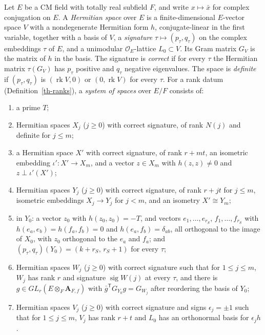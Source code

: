 \begin{definition}\label{th-spaces}
Let $E$ be a CM field with totally real subfield $F$, and write
$x\mapsto\bar x$ for complex conjugation on $E$. A \emph{Hermitian space} over
$E$ is a finite-dimensional $E$-vector space $V$ with a nondegenerate Hermitian
form $h$, conjugate-linear in the first variable, together with a basis of
$V$, a \emph{signature} $\tau\mapsto(p_\tau,q_\tau)$ on the complex embeddings
$\tau$ of $E$, and a unimodular $\mathcal O_E$-lattice $L_0\subset V$. Its
Gram matrix $G_V$ is the matrix of $h$ in the basis. The signature is
\emph{correct} if for every $\tau$ the Hermitian matrix $\tau(G_V)$ has $p_\tau$
positive and $q_\tau$ negative eigenvalues. The space is \emph{definite} if
$(p_\tau,q_\tau)$ is $(\operatorname{rk}V,0)$ or $(0,\operatorname{rk}V)$ for
every $\tau$. For a rank datum (Definition~\ref{th-ranks}), a \emph{system of
spaces} over $E/F$ consists of:
\begin{enumerate}
\item a prime $T$;
\item Hermitian spaces $X_j$ ($j\geq0$) with correct signature, of rank $N(j)$
  and definite for $j\leq m$;
\item a Hermitian space $X'$ with correct signature, of rank $r+mt$, an
  isometric embedding $\iota'\colon X'\to X_m$, and a vector $z\in X_m$ with
  $h(z,z)\neq0$ and $z\perp\iota'(X')$;
\item Hermitian spaces $Y_j$ ($j\geq0$) with correct signature, of rank
  $r+jt$ for $j\leq m$, isometric embeddings $X_j\to Y_j$ for $j<m$, and an
  isometry $X'\cong Y_m$;
\item in $Y_0$: a vector $z_0$ with $h(z_0,z_0)=-T$, and vectors
  $e_1,\ldots,e_{r_S}$, $f_1,\ldots,f_{r_S}$ with $h(e_a,e_b)=h(f_a,f_b)=0$
  and $h(e_a,f_b)=\delta_{ab}$, all orthogonal to the image of $X_0$, with
  $z_0$ orthogonal to the $e_a$ and $f_a$; and
  $(p_\tau,q_\tau)(Y_0)=(k+r_S,\,r_S+1)$ for every $\tau$;
\item Hermitian spaces $W_j$ ($j\geq0$) with correct signature such that for
  $1\leq j\leq m$, $W_j$ has rank $r$ and signature $\operatorname{sig}W(j)$
  at every $\tau$, and there is $g\in GL_r(E\otimes_F\mathbf A_{F,f})$ with
  $\bar g^{\mathsf T}G_{Y_0}g=G_{W_j}$ after reordering the basis of $Y_0$;
\item Hermitian spaces $V_j$ ($j\geq0$) with correct signature and signs
  $\epsilon_j=\pm1$ such that for $1\leq j\leq m$, $V_j$ has rank $r+t$ and
  $L_0$ has an orthonormal basis for $\epsilon_jh$.
\end{enumerate}
\end{definition}

